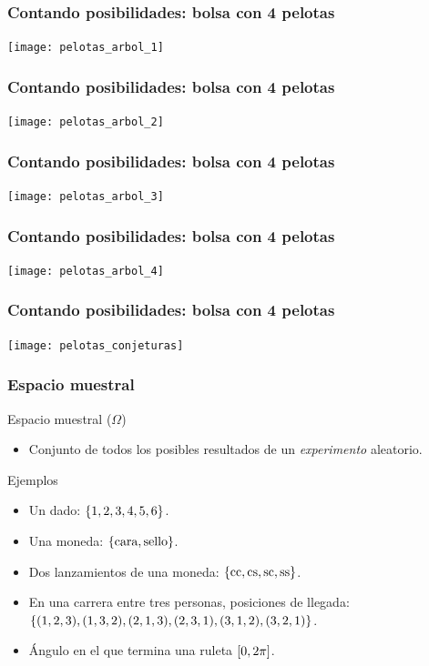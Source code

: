 \documentclass[table]{beamer}
\begin{document}
\begin{frame}
    \frametitle{Contando posibilidades: bolsa con 4 pelotas}
    \begin{center}
        \texttt{[image: pelotas\_arbol\_1]}
    \end{center}
\end{frame}

\begin{frame}
    \frametitle{Contando posibilidades: bolsa con 4 pelotas}
    \begin{center}
        \texttt{[image: pelotas\_arbol\_2]}
    \end{center}
\end{frame}

\begin{frame}
    \frametitle{Contando posibilidades: bolsa con 4 pelotas}
    \begin{center}
        \texttt{[image: pelotas\_arbol\_3]}
    \end{center}
\end{frame}

\begin{frame}
    \frametitle{Contando posibilidades: bolsa con 4 pelotas}
    \begin{center}
        \texttt{[image: pelotas\_arbol\_4]}
    \end{center}
\end{frame}

\begin{frame}
    \frametitle{Contando posibilidades: bolsa con 4 pelotas}
    \begin{center}
        \texttt{[image: pelotas\_conjeturas]}
    \end{center}
\end{frame}
\fi

\begin{frame}
    \frametitle{Espacio muestral}
    \begin{block}{Espacio muestral ($\Omega$)}
        \begin{itemize}
            \item Conjunto de todos los posibles resultados de un \emph{experimento} aleatorio.
        \end{itemize}
    \end{block}
    \begin{block}{Ejemplos}
        \begin{itemize}
            \item Un dado: $\bparens{1 , 2 , 3 , 4 , 5 , 6}$.
            \item Una moneda: $\bparens{\text{cara} , \text{sello}}$.
            \item Dos lanzamientos de una moneda: $\bparens{\text{cc}, \text{cs}, \text{sc}, \text{ss}}$.
            \item En una carrera entre tres personas, posiciones de llegada: $\bparens{\parens{1, 2, 3}, \parens{1, 3, 2}, \parens{2, 1, 3}, \parens{2, 3, 1}, \parens{3, 1, 2}, \parens{3, 2, 1}}$.
            \item Ángulo en el que termina una ruleta $\sparens{0, 2 \pi}$.
        \end{itemize}
    \end{block}
\end{frame}
\end{document}
